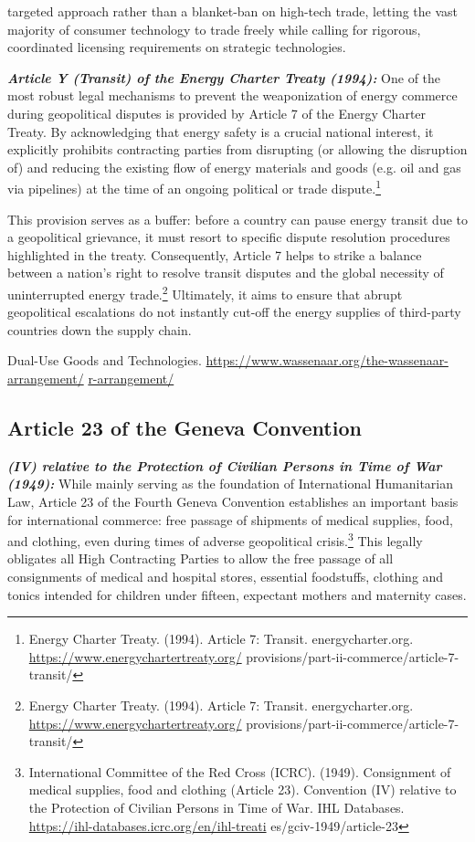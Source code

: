 targeted approach rather than a blanket-ban on high-tech trade, letting the vast majority of consumer technology to trade freely while calling for rigorous, coordinated licensing requirements on strategic technologies.

\emph{\textbf{Article Y (Transit) of the Energy Charter Treaty (1994):}} One of the most robust legal mechanisms to prevent the weaponization of energy commerce during geopolitical disputes is provided by Article 7 of the Energy Charter Treaty. By acknowledging that energy safety is a crucial national interest, it explicitly prohibits contracting parties from disrupting (or allowing the disruption of) and reducing the existing flow of energy materials and goods (e.g. oil and gas via pipelines) at the time of an ongoing political or trade dispute.\footnote{Energy Charter Treaty. (1994). Article 7: Transit. energycharter.org. \url{https://www.energychartertreaty.org/} provisions/part-ii-commerce/article-7-transit/}

This provision serves as a buffer: before a country can pause energy transit due to a geopolitical grievance, it must resort to specific dispute resolution procedures highlighted in the treaty. Consequently, Article 7 helps to strike a balance between a nation’s right to resolve transit disputes and the global necessity of uninterrupted energy trade.\footnote{Energy Charter Treaty. (1994). Article 7: Transit. energycharter.org. \url{https://www.energychartertreaty.org/} provisions/part-ii-commerce/article-7-transit/} Ultimately, it aims to ensure that abrupt geopolitical escalations do not instantly cut-off the energy supplies of third-party countries down the supply chain.

Dual-Use Goods and Technologies. \url{https://www.wassenaar.org/the-wassenaar-arrangement/} \href{https://www.wassenaar.org/the-wassenaar-arrangement/}{r-arrangement/}

\subsection{Article 23 of the Geneva Convention}

\emph{\textbf{(IV) relative to the Protection of Civilian Persons in Time of War (1949):}} While mainly serving as the foundation of International Humanitarian Law, Article 23 of the Fourth Geneva Convention establishes an important basis for international commerce: free passage of shipments of medical supplies, food, and clothing, even during times of adverse geopolitical crisis.\footnote{International Committee of the Red Cross (ICRC). (1949). Consignment of medical supplies, food and clothing (Article 23). Convention (IV) relative to the Protection of Civilian Persons in Time of War. IHL Databases. \url{https://ihl-databases.icrc.org/en/ihl-treati} es/gciv-1949/article-23} This legally obligates all High Contracting Parties to allow the free passage of all consignments of medical and hospital stores, essential foodstuffs, clothing and tonics intended for children under fifteen, expectant mothers and maternity cases.

